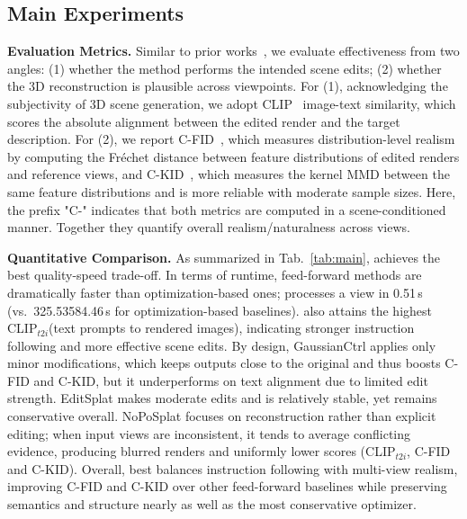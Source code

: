 \subsection{Main Experiments} 
\vspace{1mm}
\noindent\textbf{Evaluation Metrics.} Similar to prior works~\cite{lee2025editsplatmultiviewfusionattentionguided, gaussctrl, in2n, you2025instainpaintinstant3dsceneinpainting}, we evaluate effectiveness from two angles: (1) whether the method performs the intended scene edits; (2) whether the 3D reconstruction is plausible across viewpoints. For (1), acknowledging the subjectivity of 3D scene generation, we adopt CLIP~\cite{radford2021learningtransferablevisualmodels} image-text similarity, which scores the absolute alignment between the edited render and the target description. For (2), we report C-FID~\cite{heusel2018ganstrainedtimescaleupdate}, which measures distribution-level realism by computing the Fréchet distance between feature distributions of edited renders and reference views, and C-KID~\cite{bińkowski2021demystifyingmmdgans}, which measures the kernel MMD between the same feature distributions and is more reliable with moderate sample sizes. Here, the prefix "C-" indicates that both metrics are computed in a scene-conditioned manner. Together they quantify overall realism/naturalness across views.

\vspace{1mm}
\noindent\textbf{Quantitative Comparison.} As summarized in Tab.~\ref{tab:main}, {\ourmethod} achieves the best quality-speed trade-off.
%
In terms of runtime, feed-forward methods are dramatically faster than optimization-based ones; 
{\ourmethod} processes a view in 0.51\,s (vs.\ 325.53584.46\,s for optimization-based baselines). 
{\ourmethod} also attains the highest CLIP$_{t2i}$(text prompts to rendered images), indicating stronger instruction following and more effective scene edits. 
By design, GaussianCtrl applies only minor modifications, which keeps outputs close to the original and thus boosts C-FID and C-KID, but it underperforms on text alignment due to limited edit strength. 
EditSplat makes moderate edits and is relatively stable, yet remains conservative overall. 
NoPoSplat focuses on reconstruction rather than explicit editing; when input views are inconsistent, it tends to average conflicting evidence, producing blurred renders and uniformly lower scores (CLIP$_{t2i}$, C-FID and C-KID). 
Overall, {\ourmethod} best balances instruction following with multi-view realism, improving C-FID and C-KID over other feed-forward baselines while preserving semantics and structure nearly as well as the most conservative optimizer.

